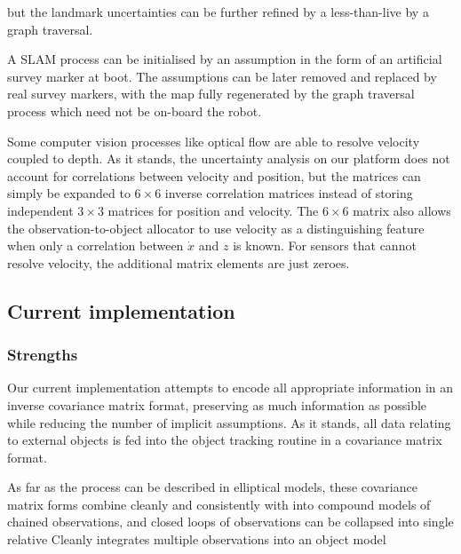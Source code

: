 \documentclass[a4paper, 11pt, titlepage]{article}
\begin{document}
      \cite{SLAMgraph}

      but the landmark uncertainties can be further refined by a less-than-live by a graph traversal.











      A SLAM process can be initialised by an assumption in the form of an artificial survey marker at boot. The assumptions can be later removed and replaced by real survey markers, with the map fully regenerated by the graph traversal process which need not be on-board the robot.
      
      Some computer vision processes like optical flow are able to resolve velocity coupled to depth.
      As it stands, the uncertainty analysis on our platform does not account for correlations between velocity and position, but the matrices can simply be expanded to \(6\times6\) inverse correlation matrices instead of storing independent \(3\times3\) matrices for position and velocity.  The \(6\times6\) matrix also allows the observation-to-object allocator to use velocity as a distinguishing feature when only a correlation between \(\dot{x}\) and \(z\) is known.  For sensors that cannot resolve velocity, the additional matrix elements are just zeroes.

  \subsection{Current implementation}
    \subsubsection{Strengths}
      
      Our current implementation attempts to encode all appropriate information in an inverse covariance matrix format, preserving as much information as possible while reducing the number of implicit assumptions.  As it stands, all data relating to external objects is fed into the object tracking routine in a covariance matrix format.  

      As far as the process can be described in elliptical models, these covariance matrix forms combine cleanly and consistently with 
       into compound models of chained observations, and closed loops of observations can be collapsed into single relative 
      Cleanly integrates multiple observations into an object model
\end{document}

